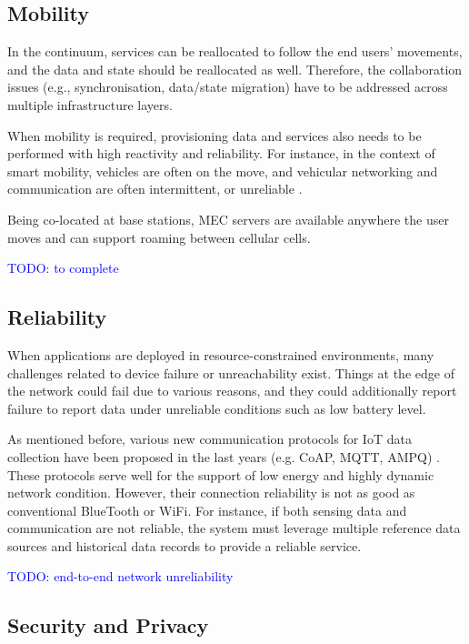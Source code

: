 \subsection{Mobility}

In the continuum, services can be reallocated to follow the end users' movements, and the data and state should be reallocated as well. Therefore, the collaboration issues (e.g., synchronisation, data/state migration) have to be addressed across multiple infrastructure layers.

When mobility is required, provisioning data and services also needs to be performed with high reactivity and reliability. For instance, in the context of smart mobility, vehicles are often on the move, and vehicular networking and communication are often intermittent, or unreliable \cite{vehicular-data-cloud}.

Being co-located at base stations, MEC servers are available anywhere the user moves and can support roaming between cellular cells.

\textcolor{blue}{TODO: to complete}

\subsection{Reliability}

When applications are deployed in resource-constrained environments, many challenges related to device failure or unreachability exist. Things at the edge of the network could fail due to various reasons, and they could additionally report failure to report data under unreliable conditions such as low battery level.

As mentioned before, various new communication protocols for IoT data collection have been proposed in the last years (e.g. CoAP, MQTT, AMPQ) \cite{mqtt-coap-amqp-http}. These protocols serve well for the support of low energy and highly dynamic network condition. However, their connection reliability is not as good as conventional BlueTooth or WiFi. For instance, if both sensing data and communication are not reliable, the system must leverage multiple reference data sources and historical data records to provide a reliable service.

\textcolor{blue}{TODO: end-to-end network unreliability}

\subsection{Security and Privacy}

